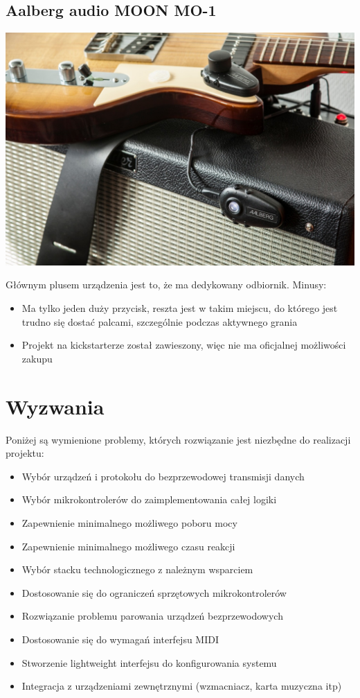 \documentclass[eng,printmode]{mgr}
\begin{document}
\subsection{Aalberg audio MOON MO-1}
\includegraphics[width=\textwidth]{moon1}

Głównym plusem urządzenia jest to, że ma dedykowany odbiornik.
Minusy:

\begin{itemize}
\item Ma tylko jeden duży przycisk, reszta jest w takim miejscu, do którego jest trudno się dostać palcami, szczególnie podczas aktywnego grania
\item Projekt na kickstarterze został zawieszony, więc nie ma oficjalnej możliwości zakupu
\end{itemize}

\pagebreak
\section{Wyzwania}

Poniżej są wymienione problemy, których rozwiązanie jest niezbędne do realizacji projektu:
	
\begin{itemize}
\item Wybór urządzeń i protokołu do bezprzewodowej transmisji danych
\item Wybór mikrokontrolerów do zaimplementowania całej logiki
\item Zapewnienie minimalnego możliwego poboru mocy
\item Zapewnienie minimalnego możliwego czasu reakcji
\item Wybór stacku technologicznego z należnym wsparciem
\item Dostosowanie się do ograniczeń sprzętowych mikrokontrolerów
\item Rozwiązanie problemu parowania urządzeń bezprzewodowych
\item Dostosowanie się do wymagań interfejsu MIDI
\item Stworzenie lightweight interfejsu do konfigurowania systemu
\item Integracja z urządzeniami zewnętrznymi (wzmacniacz, karta muzyczna itp)
\end{itemize}
\end{document}

